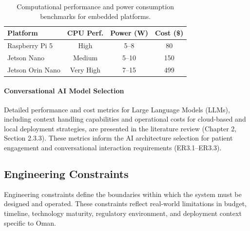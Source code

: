 \begin{table}[H]
\centering
\footnotesize
\begin{tabular}{|l|c|c|c|}
\hline
\textbf{Platform} & \textbf{CPU Perf.} & \textbf{Power (W)} & \textbf{Cost (\$)} \\
\hline
Raspberry Pi 5 \cite{raspberrypi2024} & High & 5--8 & 80 \\
Jetson Nano \cite{jetsonnano2024} & Medium & 5--10 & 150 \\
Jetson Orin Nano \cite{jetsonorin2024} & Very High & 7--15 & 499 \\
\hline
\end{tabular}
\caption{Computational performance and power consumption benchmarks for embedded platforms.}
\label{tab:compute_metrics}
\end{table}

\paragraph{Conversational AI Model Selection}
Detailed performance and cost metrics for Large Language Models (LLMs), including context handling capabilities and operational costs for cloud-based and local deployment strategies, are presented in the literature review (Chapter 2, Section 2.3.3). These metrics inform the AI architecture selection for patient engagement and conversational interaction requirements (ER3.1--ER3.3).

\subsection{Engineering Constraints}

Engineering constraints define the boundaries within which the system must be designed and operated. These constraints reflect real-world limitations in budget, timeline, technology maturity, regulatory environment, and deployment context specific to Oman.

